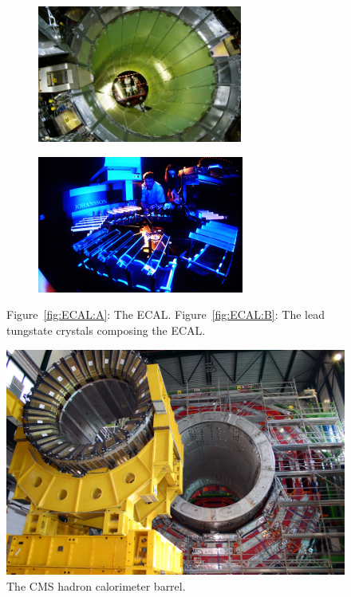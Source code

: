 	\begin{figure}[H]
		\begin{subfigure}{.5\linewidth}
			\centering
			\includegraphics[height = 4.5cm]{fig/chapt2/ECAL_barrel.jpg}
			\subcaption{\label{fig:ECAL:A}}
		\end{subfigure}
		\begin{subfigure}{.5\linewidth}
			\centering
			\includegraphics[height = 4.5cm]{fig/chapt2/ECAL_crystals.jpg}
			\subcaption{\label{fig:ECAL:B}}
		\end{subfigure}
		\caption{\label{fig:ECAL} Figure~\ref{fig:ECAL:A}: The \acl{ECAL}. Figure~\ref{fig:ECAL:B}: The lead tungstate crystals composing the ECAL.}
	\end{figure}
	
\begingroup\setlength{\intextsep}{5pt}\setlength{\columnsep}{15pt}
	
	\begin{figure}
		\centering
		\includegraphics[width = \linewidth]{fig/chapt2/HCAL.jpg}
		\caption{\label{fig:HCAL} The CMS hadron calorimeter barrel.}
	\end{figure}
	
